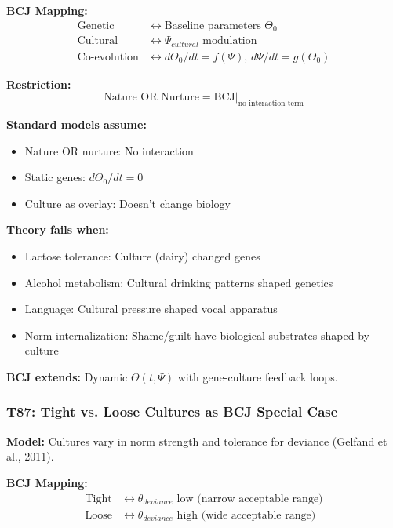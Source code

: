 \textbf{BCJ Mapping:}
\begin{align}
\text{Genetic} &\leftrightarrow \text{Baseline parameters } \Theta_0 \\
\text{Cultural} &\leftrightarrow \Psi_{cultural} \text{ modulation} \\
\text{Co-evolution} &\leftrightarrow d\Theta_0/dt = f(\Psi), \, d\Psi/dt = g(\Theta_0)
\end{align}

\textbf{Restriction:}
\begin{equation}
\text{Nature OR Nurture} = \text{BCJ} \big|_{\text{no interaction term}}
\end{equation}

\begin{tcolorbox}[colback=red!5!white, colframe=red!75!black,
    title=Boundary Condition: Where Gene-Culture Separation Fails]
\textbf{Standard models assume:}
\begin{itemize}[nosep]
\item Nature OR nurture: No interaction
\item Static genes: $d\Theta_0/dt = 0$
\item Culture as overlay: Doesn't change biology
\end{itemize}

\textbf{Theory fails when:}
\begin{itemize}[nosep]
\item Lactose tolerance: Culture (dairy) changed genes
\item Alcohol metabolism: Cultural drinking patterns shaped genetics
\item Language: Cultural pressure shaped vocal apparatus
\item Norm internalization: Shame/guilt have biological substrates shaped by culture
\end{itemize}

\textbf{BCJ extends:} Dynamic $\Theta(t, \Psi)$ with gene-culture feedback loops.
\end{tcolorbox}

\subsubsection*{T87: Tight vs. Loose Cultures as BCJ Special Case}

\textbf{Model:} Cultures vary in norm strength and tolerance for deviance (Gelfand et al., 2011).

\textbf{BCJ Mapping:}
\begin{align}
\text{Tight} &\leftrightarrow \theta_{deviance} \text{ low (narrow acceptable range)} \\
\text{Loose} &\leftrightarrow \theta_{deviance} \text{ high (wide acceptable range)}
\end{align}

